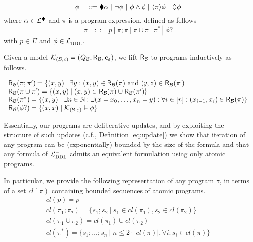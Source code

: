 \documentclass{llncs}
\newcommand{\cl}{cl}
\newcommand{\test}[1]{{#1}?}
\newcommand{\dlangm}{{\mathcal L}_{\acro{DDL}}^{-}}
\newcommand{\pis}[1]{{\mathbf e}_{#1}}
\newcommand{\carriers}[1]{Q_{#1}}
\newcommand{\kmod}[2]{{\cal K}_{(#1,#2)}}
\newcommand{\rels}[1]{{\sf R_{#1}}}
\newcommand{\views}{\mathcal B}
\newcommand{\sem}{\varepsilon}
\begin{document}
$$ \phi \quad ::= \blacklozenge \alpha ~|~ \neg \phi ~|~ \phi \wedge \phi ~|~ \langle{\pi}\rangle \phi ~|~ \lozenge \phi$$ 
where $\alpha \in \mathcal L^{\blacklozenge}$ and $\pi$ is a program expression, defined as follows 
$$
\pi \quad ::= p \ | \ \pi;\pi \ | \ \pi \cup \pi \ |  \ \pi^\ast \ | \ \test \phi
$$
with $p \in \Pi$ and $\phi \in \dlangm$. 

Given a model $\kmod \views \sem = (\carriers \views, \rels \views, \pis \sem)$, we lift $\rels \views$ to programs inductively as follows.

\begin{equation}\label{eq:program}
\begin{array}{l}
\rels \views(\pi;\pi') = \{(x,y) \mid \exists y: (x,y) \in \rels \views(\pi) \text { and } (y,z) \in \rels \views(\pi') \\
\rels \views(\pi \cup \pi') = \{(x,y) \mid (x,y) \in \rels \views(\pi) \cup \rels \views(\pi')\} \\
\rels \views(\pi^\ast) = \{(x,y) \mid \exists n \in \mathbb N: \exists (x = x_0,\ldots,x_n = y): \forall i \in [n]: (x_{i-1},x_i) \in \rels \views(\pi)\} \\
\rels \views(\test \phi) = \{(x,x) \mid \kmod \views \sem \vDash \phi\}
\end{array}
\end{equation}

Essentially, our programs are deliberative updates, and by exploiting the structure of such updates (c.f., Definition \ref{eq:update}) we show that iteration of any program can be (exponentially) bounded by the size of the formula and that any formula of $\dlangm$ admits an equivalent formulation using only atomic programs.

In particular, we provide the following representation of any program $\pi$, in terms of a set $\cl(\pi)$ containing bounded sequences of atomic programs. 
\begin{equation}\label{eq:clprog}
\begin{array}{l}
\cl(p) = p \\
\cl (\pi_1;\pi_2) = \{s_1;s_2 \mid s_1 \in \cl(\pi_1), s_2 \in \cl(\pi_2)\} \\
\cl (\pi_1 \cup \pi_2) = \cl(\pi_1) \cup \cl(\pi_2) \\
\cl (\pi^\ast) = \{s_1;\ldots;s_n \mid n \leq 2 \cdot |\cl(\pi)|, \forall i: s_i \in \cl(\pi)\} \\
\end{array}
\end{equation}
\end{document}
